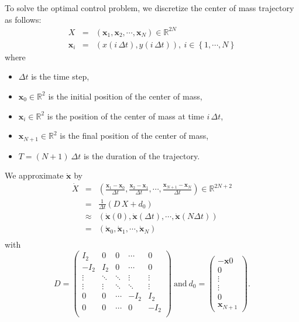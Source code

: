 \documentclass{article}
\newcommand\vect[1]{\mathbf{#1}}
\newcommand\x{\vect{x}}
\newcommand\dx{\vect{\dot{x}}}
\newcommand\reals{\mathbb{R}}
\begin{document}
To solve the optimal control problem, we discretize the center of mass trajectory as follows:
\begin{eqnarray}\label{eq:X}
  X &=& \left(\x_1,\x_2,\cdots,\x_N\right)\in\reals^{2N}\\
  \x_i &=& \left(x(i\,\Delta t), y(i\,\Delta t)\right),\ i\in\left\{1,\cdots,N\right\}
\end{eqnarray}
where
\begin{itemize}
\item $\Delta t$ is the time step,
\item $\x_0\in\reals^2$ is the initial position of the center of mass,
\item $\x_i\in\reals^2$ is the position of the center of mass at time $i\,\Delta t$,
\item $\x_{N+1}\in\reals^2$ is the final position of the center of mass,
\item $T = (N+1)\ \Delta t$ is the duration of the trajectory.
\end{itemize}
We approximate $\dx$ by
\begin{eqnarray}
  \label{eq:dX}
  \dot{X}&=&\left(\frac{\x_1-\x_0}{\Delta t}, \frac{\x_2-\x_1}{\Delta t},\cdots,\frac{\x_{N+1}-\x_N}{\Delta t}\right)\in\reals^{2N+2}\\
  \label{eq:dotX}
  &=&  \frac{1}{\Delta t}(D\,X + d_0)\\
  &\approx& \left(\dx(0), \dx(\Delta t),\cdots,\dx(N \Delta t)\right) \\
  &=& \left(\dx_0, \dx_1,\cdots,\dx_N\right) \\
\end{eqnarray}
with
$$
D=\left(\begin{array}{ccccc}
  I_2    & 0      & 0      & \cdots & 0\\
  -I_2   & I_2    & 0      & \cdots & 0 \\
  \vdots & \ddots & \ddots & \vdots & \vdots \\
  \vdots & \vdots & \ddots & \ddots & \vdots \\
  0      &   0    & \cdots & -I_2   &  I_2\\
  0      &   0    & \cdots &   0    &  -I_2\\
\end{array}\right)\ \mbox{and}\
d_0 = \left(\begin{array}{c}-\x0\\ 0 \\ \vdots \\ \vdots \\ 0 \\ \x_{N+1}\end{array}\right).
$$
\end{document}
